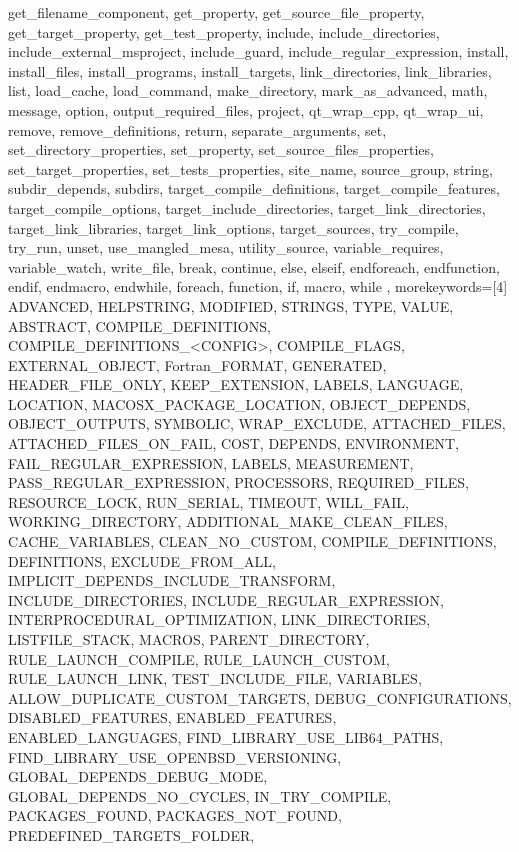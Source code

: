 {{      get_filename_component, get_property, get_source_file_property,
      get_target_property, get_test_property, include, include_directories,
      include_external_msproject, include_guard,
      include_regular_expression, install, install_files, install_programs,
      install_targets, link_directories, link_libraries, list, load_cache,
      load_command, make_directory, mark_as_advanced, math, message,
      option, output_required_files, project, qt_wrap_cpp, qt_wrap_ui,
      remove, remove_definitions, return, separate_arguments, set,
      set_directory_properties, set_property, set_source_files_properties,
      set_target_properties, set_tests_properties, site_name, source_group,
      string, subdir_depends, subdirs, target_compile_definitions,
      target_compile_features, target_compile_options,
      target_include_directories, target_link_directories,
      target_link_libraries, target_link_options, target_sources,
      try_compile, try_run, unset, use_mangled_mesa, utility_source,
      variable_requires, variable_watch, write_file, break, continue, else,
      elseif, endforeach, endfunction, endif, endmacro, endwhile, foreach,
      function, if, macro, while },
    morekeywords=[4]{ ADVANCED, HELPSTRING, MODIFIED, STRINGS, TYPE, VALUE,
      ABSTRACT, COMPILE_DEFINITIONS, COMPILE_DEFINITIONS_<CONFIG>,
      COMPILE_FLAGS, EXTERNAL_OBJECT, Fortran_FORMAT, GENERATED,
      HEADER_FILE_ONLY, KEEP_EXTENSION, LABELS, LANGUAGE, LOCATION,
      MACOSX_PACKAGE_LOCATION, OBJECT_DEPENDS, OBJECT_OUTPUTS, SYMBOLIC,
      WRAP_EXCLUDE, ATTACHED_FILES, ATTACHED_FILES_ON_FAIL, COST, DEPENDS,
      ENVIRONMENT, FAIL_REGULAR_EXPRESSION, LABELS, MEASUREMENT,
      PASS_REGULAR_EXPRESSION, PROCESSORS, REQUIRED_FILES, RESOURCE_LOCK,
      RUN_SERIAL, TIMEOUT, WILL_FAIL, WORKING_DIRECTORY,
      ADDITIONAL_MAKE_CLEAN_FILES, CACHE_VARIABLES, CLEAN_NO_CUSTOM,
      COMPILE_DEFINITIONS, DEFINITIONS, EXCLUDE_FROM_ALL,
      IMPLICIT_DEPENDS_INCLUDE_TRANSFORM, INCLUDE_DIRECTORIES,
      INCLUDE_REGULAR_EXPRESSION, INTERPROCEDURAL_OPTIMIZATION,
      LINK_DIRECTORIES, LISTFILE_STACK, MACROS, PARENT_DIRECTORY,
      RULE_LAUNCH_COMPILE, RULE_LAUNCH_CUSTOM, RULE_LAUNCH_LINK,
      TEST_INCLUDE_FILE, VARIABLES, ALLOW_DUPLICATE_CUSTOM_TARGETS,
      DEBUG_CONFIGURATIONS, DISABLED_FEATURES, ENABLED_FEATURES,
      ENABLED_LANGUAGES, FIND_LIBRARY_USE_LIB64_PATHS,
      FIND_LIBRARY_USE_OPENBSD_VERSIONING, GLOBAL_DEPENDS_DEBUG_MODE,
      GLOBAL_DEPENDS_NO_CYCLES, IN_TRY_COMPILE, PACKAGES_FOUND,
      PACKAGES_NOT_FOUND, PREDEFINED_TARGETS_FOLDER,
}}
